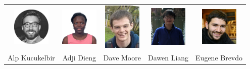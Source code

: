 \documentclass[10pt,
               xcolor={usenames,dvipsnames},
               hyperref={colorlinks,linktoc=all,citecolor=Plum,linkcolor=MidnightBlue,urlcolor=MidnightBlue},noamssymb]{beamer}
\begin{document}
\begin{frame}[plain]
\footnotesize
\begin{center}
\begin{tabular}{ccccc}
\includegraphics[width=18mm]{img/alp.png} &
\includegraphics[width=18mm]{img/adji.jpg} &
\includegraphics[width=18mm]{img/dave.jpg} &
\includegraphics[width=18mm]{img/dawen.jpg} &
\includegraphics[width=18mm]{img/eugene.jpg} \\
Alp Kucukelbir & Adji Dieng & Dave Moore & Dawen Liang & Eugene Brevdo \\
\end{tabular}

\vspace{-2ex}


\end{center}
\end{frame}
\end{document}
